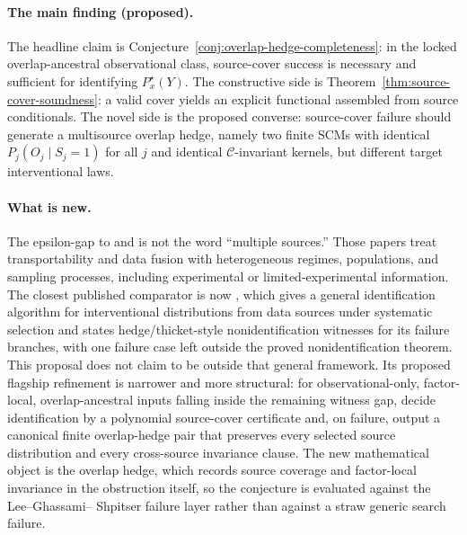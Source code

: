 \documentclass[11pt]{article}
\theoremstyle{definition}
\theoremstyle{plain}
\theoremstyle{remark}
\begin{document}
\paragraph{The main finding (proposed).}
The headline claim is Conjecture~\ref{conj:overlap-hedge-completeness}: in the
locked overlap-ancestral observational class, source-cover success is
necessary and sufficient for identifying \(P^\star_x(Y)\).  The constructive
side is Theorem~\ref{thm:source-cover-soundness}: a valid cover yields an
explicit functional assembled from source conditionals.  The novel side is
the proposed converse: source-cover failure should generate a multisource
overlap hedge, namely two finite SCMs with identical \(P_j(O_j\mid S_j=1)\)
for all \(j\) and identical \(\mathcal C\)-invariant kernels, but different
target interventional laws.

\paragraph{What is new.}
The epsilon-gap to \citet{BareinboimPearl2014MZTransport} and
\citet{BareinboimPearl2016DataFusion} is not the word ``multiple sources.''
Those papers treat transportability and data fusion with heterogeneous
regimes, populations, and sampling processes, including experimental or
limited-experimental information.  The closest published comparator is now
\citet{LeeGhassamiShpitser2024DataFusionSelection}, which gives a general
identification algorithm for interventional distributions from data sources
under systematic selection and states hedge/thicket-style nonidentification
witnesses for its failure branches, with one failure case left outside the
proved nonidentification theorem.  This proposal does not claim to be outside
that general framework.  Its proposed flagship refinement is narrower and more
structural: for observational-only, factor-local, overlap-ancestral inputs
falling inside the remaining witness gap, decide identification by a
polynomial source-cover certificate and, on failure, output a canonical finite
overlap-hedge pair that preserves every selected source distribution and every
cross-source invariance clause.  The new mathematical object is the overlap
hedge, which records source coverage and factor-local invariance in the
obstruction itself, so the conjecture is evaluated against the Lee--Ghassami--
Shpitser failure layer rather than against a straw generic search failure.
\end{document}
